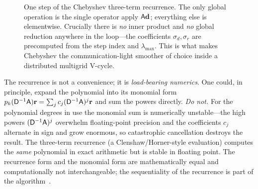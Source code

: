 \begin{figure}[t]
\centering
{}
\caption[The Chebyshev recurrence is inner-product-free]{One step of the Chebyshev
three-term recurrence. The only global operation is the single operator apply
$\mathsf{A}\mathbf{d}$; everything else is elementwise. Crucially there is \emph{no} inner
product and \emph{no} global reduction anywhere in the loop---the coefficients
$\sigma_d,\sigma_r$ are precomputed from the step index and $\lambda_{\max}$. This is
what makes Chebyshev the communication-light smoother of choice inside a
distributed multigrid V-cycle.}
\label{fig:smoo-chebdataflow}
\end{figure}

\begin{pitfall}
The recurrence is not a convenience; it is \emph{load-bearing numerics}. One could,
in principle, expand the polynomial into its monomial form
$p_k(\mathsf{D}^{-1}\mathsf{A})\mathbf{r} = \sum_j c_j (\mathsf{D}^{-1}\mathsf{A})^{j}\mathbf{r}$ and sum the
powers directly. \emph{Do not.} For the polynomial degrees in use the monomial sum
is numerically unstable---the high powers $(\mathsf{D}^{-1}\mathsf{A})^j$ overwhelm
floating-point precision and the coefficients $c_j$ alternate in sign and grow
enormous, so catastrophic cancellation destroys the result. The three-term
recurrence (a Clenshaw/Horner-style evaluation) computes the \emph{same} polynomial
in exact arithmetic but is stable in floating point. The recurrence form and the
monomial form are mathematically equal and computationally not interchangeable; the
sequentiality of the recurrence is part of the algorithm~\citep[\S2]{phillipsfischer2022}.
\end{pitfall}

